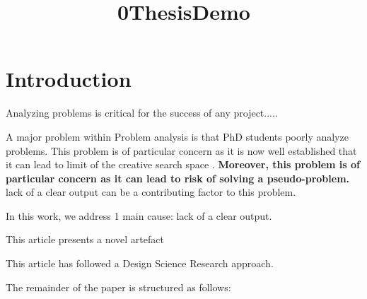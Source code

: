 \documentclass{article}
\title{0ThesisDemo}
\author{}
\newcommand{\todo}[1] {\iffalse #1 \fi} %
\begin{document}
\maketitle
      

\section{Introduction}

Analyzing problems is critical for the success of any project.....
    
A major problem within Problem analysis is that PhD students poorly analyze problems. This problem is of particular concern as it is now well established that it can lead to limit of the creative search space \cite{Kokotovich2008}.\textbf{ Moreover, this problem is of particular concern as it can lead to risk of solving a pseudo-problem. } lack of a clear output can be a contributing factor to this problem. \todo{Is the lack of guidelines a posible cause?}
    

    
In this work, we address 1 main cause: lack of a clear output. 
    
This article presents a novel artefact
    

    

      
This article has followed a Design Science Research approach.

The remainder of the paper is structured as follows: 

    
      


\end{document}
